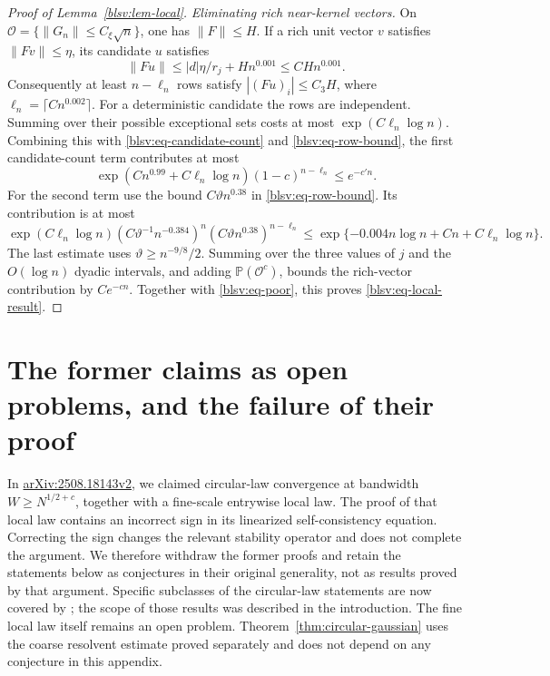\documentclass[11pt,reqno]{amsart}
\numberwithin{equation}{section}
\theoremstyle{plain}
\theoremstyle{definition}
\theoremstyle{remark}
\providecommand{\blsvP}{\mathbb P}
\begin{document}
\begin{proof}[Proof of Lemma~\ref{blsv:lem-local}]
\smallskip\noindent\emph{Eliminating rich near-kernel vectors.}
On $\mathcal O=\{\|G_n\|\le C_\xi\sqrt n\}$, one has $\|F\|\le H$.
If a rich unit vector $v$ satisfies $\|Fv\|\le\eta$, its candidate $u$
satisfies
\[
 \|Fu\|\le |d|\eta/r_j+Hn^{0.001}\le C Hn^{0.001}.
\]
Consequently at least $n-\ell_n$ rows satisfy $|(Fu)_i|\le C_3H$,
where $\ell_n=\lceil Cn^{0.002}\rceil$.
For a deterministic candidate the rows are independent. Summing over
their possible exceptional sets costs at most
$\exp(C\ell_n\log n)$. Combining this with
\eqref{blsv:eq-candidate-count} and \eqref{blsv:eq-row-bound}, the first
candidate-count term contributes at most
\[
 \exp(Cn^{0.99}+C\ell_n\log n)(1-c)^{n-\ell_n}\le e^{-c'n}.
\]
For the second term use the bound $C\vartheta n^{0.38}$ in
\eqref{blsv:eq-row-bound}. Its contribution is at most
\[
 \exp(C\ell_n\log n)
 (C\vartheta^{-1}n^{-0.384})^n(C\vartheta n^{0.38})^{n-\ell_n}
 \le \exp\{-0.004n\log n+Cn+C\ell_n\log n\}.
\]
The last estimate uses $\vartheta\ge n^{-9/8}/2$. Summing over the three values
of $j$ and the $O(\log n)$ dyadic intervals, and adding
$\blsvP(\mathcal O^c)$, bounds the rich-vector contribution by $Ce^{-cn}$.
Together with \eqref{blsv:eq-poor}, this proves
\eqref{blsv:eq-local-result}.
\end{proof}




\appendix
\section{The former claims as open problems, and the failure of their proof}
\label{sec:former-claims}
\label{sec:conjectures}

In \href{https://arxiv.org/abs/2508.18143v2}{arXiv:2508.18143v2}, we claimed circular-law convergence at bandwidth
\(W\geq N^{1/2+c}\), together with a fine-scale entrywise local law.
The proof of that local law contains an incorrect sign in its linearized
self-consistency equation.  Correcting the sign changes the relevant
stability operator and does not complete the argument.  We therefore
withdraw the former proofs and retain the statements below as conjectures
in their original generality, not as results proved by that argument.
Specific subclasses of the circular-law statements are now covered by
\cite{han2025slow,han2026optimal}; the scope of those results was described
in the introduction. The fine local law itself remains an open problem.
Theorem~\ref{thm:circular-gaussian}
uses the coarse resolvent estimate proved separately and does not depend
on any conjecture in this appendix.
\end{document}
